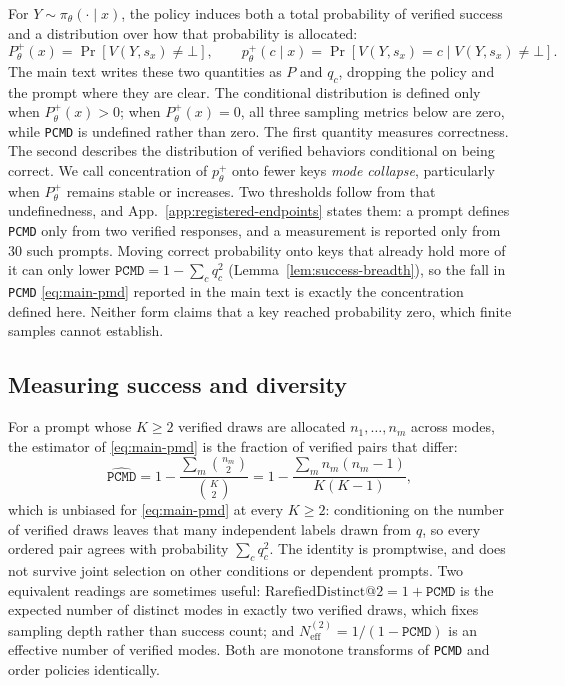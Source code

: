 \documentclass{article}
\newcommand{\1}{\mathbf 1}
\newcommand{\pmd}{\texttt{PCMD}}
\newcommand{\neff}{\ensuremath{N^{(2)}_{\mathrm{eff}}}}
\theoremstyle{remark}
\theoremstyle{definition}
\theoremstyle{plain}
\begin{document}
For $Y\sim\pi_\theta(\cdot\mid x)$, the policy induces both a total probability
of verified success and a distribution over how that probability is allocated:
\[
 P_\theta^+(x)=\Pr[V(Y,s_x)\neq\bot],
 \qquad
 p_\theta^+(c\mid x)=\Pr[V(Y,s_x)=c\mid V(Y,s_x)\neq\bot].
\]
The main text writes these two quantities as $P$ and $q_c$, dropping the
policy and the prompt where they are clear.
The conditional distribution is defined only when $P_\theta^+(x)>0$;
when $P_\theta^+(x)=0$, all three sampling metrics below are zero, while
\pmd{} is undefined rather than zero.
The first quantity measures correctness. The second describes the distribution
of verified behaviors conditional on being correct. We call concentration of
$p_\theta^+$ onto fewer keys \emph{mode collapse}, particularly when
$P_\theta^+$ remains stable or increases. Two thresholds follow from that
undefinedness, and App.~\ref{app:registered-endpoints} states them: a prompt
defines \pmd{} only from two verified responses, and a measurement is reported
only from 30 such prompts.
Moving correct probability onto keys that already hold more of it can only
lower $\pmd{}=1-\sum_c q_c^2$ (Lemma~\ref{lem:success-breadth}), so the fall in
\pmd{} \eqref{eq:main-pmd} reported in the main text is exactly the
concentration defined here. Neither form claims that a key
reached probability zero, which finite samples cannot establish.

\subsection{Measuring success and diversity}
\label{app:metric-sampling}

For a prompt whose $K\ge2$ verified draws are allocated $n_1,\dots,n_m$ across
modes, the estimator of \eqref{eq:main-pmd} is the fraction of verified pairs
that differ:
\begin{equation}
 \widehat{\pmd}
 =1-\frac{\sum_m \binom{n_m}{2}}{\binom{K}{2}}
 =1-\frac{\sum_m n_m(n_m-1)}{K(K-1)},
 \label{eq:main-pmd-estimator}
\end{equation}
which is unbiased for \eqref{eq:main-pmd} at every $K\ge2$: conditioning on the
number of verified draws leaves that many independent labels drawn from $q$, so
every ordered pair agrees with probability $\sum_c q_c^2$. The identity is
promptwise, and does not survive joint selection on other conditions or
dependent prompts. Two equivalent
readings are sometimes useful: $\mathrm{RarefiedDistinct@}2=1+\pmd$ is the
expected number of distinct modes in exactly two verified draws, which fixes
sampling depth rather than success count; and $\neff=1/(1-\pmd)$ is an
effective number of verified modes. Both are monotone transforms of \pmd{} and
order policies identically.
\end{document}
